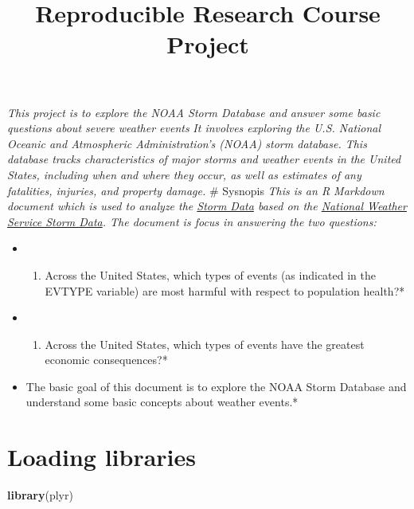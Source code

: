 \documentclass[]{article}
\title{Reproducible Research Course Project}
\author{}
\date{}
\newenvironment{Shaded}{\begin{snugshade}}{\end{snugshade}}
\newcommand{\KeywordTok}[1]{\textcolor[rgb]{0.13,0.29,0.53}{\textbf{#1}}}
\newcommand{\NormalTok}[1]{#1}
\providecommand{\tightlist}{%
  \setlength{\itemsep}{0pt}\setlength{\parskip}{0pt}}
\begin{document}
\maketitle

\emph{This project is to explore the NOAA Storm Database and answer some
basic questions about severe weather events} \emph{It involves exploring
the U.S. National Oceanic and Atmospheric Administration's (NOAA) storm
database. This database tracks characteristics of major storms and
weather events in the United States, including when and where they
occur, as well as estimates of any fatalities, injuries, and property
damage. } \# Sysnopis \emph{This is an R Markdown document which is used
to analyze the
\href{https://d396qusza40orc.cloudfront.net/repdata\%2Fdata\%2FStormData.csv.bz2}{Storm
Data} based on the
\href{https://d396qusza40orc.cloudfront.net/repdata\%2Fpeer2_doc\%2Fpd01016005curr.pdf}{National
Weather Service Storm Data}. The document is focus in answering the two
questions:}

\begin{itemize}
\item
  \begin{enumerate}
  \def\labelenumi{\arabic{enumi}.}
  \tightlist
  \item
    Across the United States, which types of events (as indicated in the
    EVTYPE variable) are most harmful with respect to population
    health?*
  \end{enumerate}
\item
  \begin{enumerate}
  \def\labelenumi{\arabic{enumi}.}
  \setcounter{enumi}{1}
  \tightlist
  \item
    Across the United States, which types of events have the greatest
    economic consequences?*
  \end{enumerate}
\item
  The basic goal of this document is to explore the NOAA Storm Database
  and understand some basic concepts about weather events.*
\end{itemize}

\section{Loading libraries}\label{loading-libraries}

\begin{Shaded}
\begin{Highlighting}[]
\KeywordTok{library}\NormalTok{(plyr)}
\end{Highlighting}
\end{Shaded}
\end{document}
